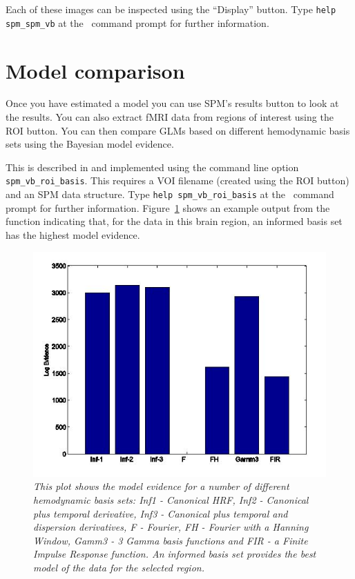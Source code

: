 Each of these images can be inspected using the ``Display'' button. Type \verb!help spm_spm_vb! at the \matlab\ command prompt for further information.

\section{Model comparison}

Once you have estimated a model you can use SPM's results button to look at the results. You can also extract fMRI data from regions of interest using the ROI button. You can then compare GLMs based on different hemodynamic basis sets using the Bayesian model evidence.

This is described in \cite{will_bayes_srglm} and implemented using the command line option \texttt{spm\_vb\_roi\_basis}. This requires a VOI filename (created using the ROI button) and an SPM data structure. Type \texttt{help spm\_vb\_roi\_basis} at the \matlab\ command prompt for further information. Figure~\ref{basis} shows an example output from the function indicating that, for the data in this brain region, an informed basis set has the highest model evidence.

\begin{figure}
\begin{center}
\includegraphics[width=150mm]{fmri_est/basis}
\end{center}
\caption{\em This plot shows the model evidence for a number of different hemodynamic basis sets: Inf1 - Canonical HRF, Inf2 - Canonical plus temporal derivative, Inf3 - Canonical plus temporal and dispersion derivatives, F - Fourier, FH - Fourier with a Hanning Window, Gamm3 - 3 Gamma basis functions and FIR - a Finite Impulse Response function. An informed basis set provides the best model of the data for the selected region.  \label{basis}}
\end{figure}
